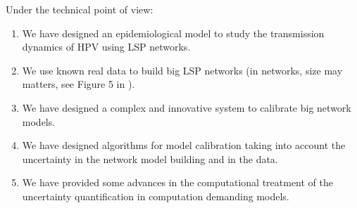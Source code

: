 Under the technical point of view:
\begin{enumerate}
	\item We have designed an epidemiological model to study the transmission dynamics of HPV using LSP networks.
	\item We use known real data to build big LSP networks (in networks, size may matters, see Figure 5 in \cite{villanueva2013epidemic}).
	\item We have designed a complex and innovative system to calibrate big network models.
	\item We have designed algorithms for model calibration taking into account the uncertainty in the network model building and in the data. 
	\item We have provided some advances in the computational treatment of the uncertainty quantification in computation demanding models.
\end{enumerate}
